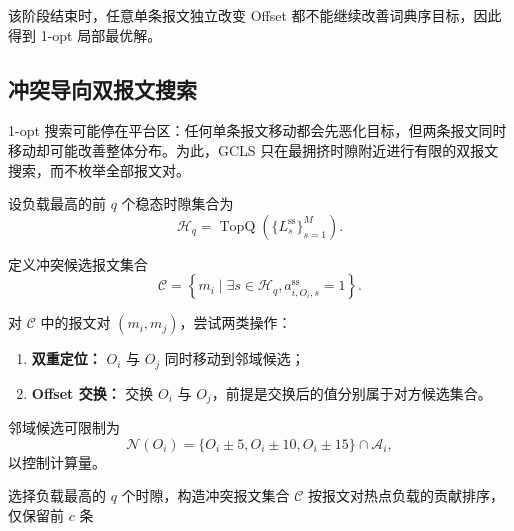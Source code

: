 \documentclass[UTF8,12pt,a4paper]{ctexart}
\newcommand{\Oset}{\mathcal{A}}
\newcommand{\Hset}{\mathcal{H}}
\begin{document}
该阶段结束时，任意单条报文独立改变 Offset 都不能继续改善词典序目标，因此得到 1-opt 局部最优解。

\subsection{冲突导向双报文搜索}

1-opt 搜索可能停在平台区：任何单条报文移动都会先恶化目标，但两条报文同时移动却可能改善整体分布。为此，GCLS 只在最拥挤时隙附近进行有限的双报文搜索，而不枚举全部报文对。

设负载最高的前 $q$ 个稳态时隙集合为
\begin{equation}
 \Hset_q=\operatorname{TopQ}\left(\{L^{\mathrm{ss}}_s\}_{s=1}^{M}\right).
\end{equation}

定义冲突候选报文集合
\begin{equation}
 \mathcal{C}=\left\{m_i\mid \exists s\in\Hset_q,
 a^{\mathrm{ss}}_{i,O_i,s}=1\right\}.
\end{equation}

对 $\mathcal{C}$ 中的报文对 $(m_i,m_j)$，尝试两类操作：

\begin{enumerate}
  \item \textbf{双重定位：} $O_i$ 与 $O_j$ 同时移动到邻域候选；
  \item \textbf{Offset 交换：} 交换 $O_i$ 与 $O_j$，前提是交换后的值分别属于对方候选集合。
\end{enumerate}

邻域候选可限制为
\begin{equation}
 \mathcal{N}(O_i)=\{O_i\pm5,O_i\pm10,O_i\pm15\}\cap\Oset_i,
\end{equation}
以控制计算量。

\begin{algorithm}[htbp]
\caption{冲突导向双报文搜索}
\label{alg:pair-search}
选择负载最高的 $q$ 个时隙，构造冲突报文集合 $\mathcal{C}$\;
按报文对热点负载的贡献排序，仅保留前 $c$ 条\;
\;
\end{algorithm}
\end{document}
